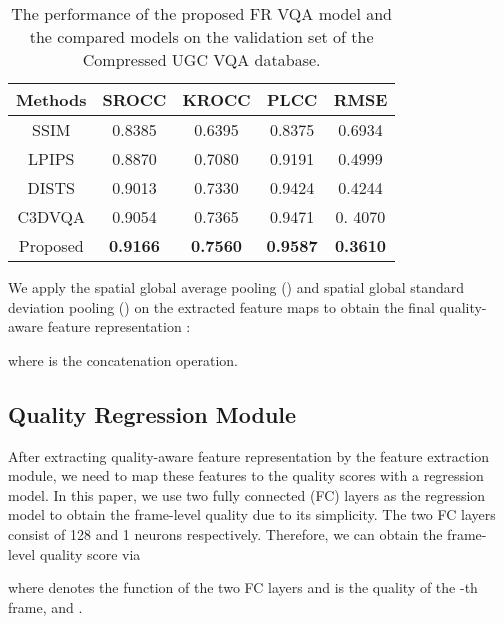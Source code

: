 \documentclass{article}
\begin{document}
\begin{table}
	\small
\centering
	\renewcommand{\arraystretch}{1.15}
	\caption{The performance of the proposed FR VQA model and the compared models on the validation set of the Compressed UGC VQA database.}
	\label{FR_Compressed}
\begin{tabular}{c|cccc}
		\toprule[.15em]
		
		Methods & SROCC & KROCC & PLCC & RMSE   \\
		\hline
		
		SSIM \cite{wang2004image}    &0.8385 &0.6395  & 0.8375  &0.6934  \\
		
LPIPS \cite{zhang2018unreasonable} &0.8870  	&0.7080 &0.9191 &0.4999\\
		DISTS\cite{ding2020image} &0.9013 &0.7330 &0.9424 &0.4244 \\
		C3DVQA \cite{xu2020c3dvqa} & 0.9054 	&0.7365& 0.9471&  0. 4070 \\
		Proposed    & \textbf{0.9166} 	&\textbf{ 0.7560} 	&\textbf{0.9587} 	&\textbf{0.3610} \\
		
		\bottomrule[.15em]
		
	\end{tabular}
	
	
	


\end{table}




We apply the spatial global average pooling () and spatial global standard deviation pooling () on the extracted feature maps  to obtain the final quality-aware feature representation :

where  is the concatenation operation.
\subsection{Quality Regression Module}
After extracting quality-aware feature representation by the feature extraction module, we need to map these features to the quality scores with a regression model. In this paper, we use two fully connected (FC) layers as the regression model to obtain the frame-level quality due to its simplicity. The two FC layers consist of 128 and 1 neurons respectively. Therefore, we can obtain the frame-level quality score via


where  denotes the function of the two FC layers and  is the quality of the -th frame, and .
\end{document}
